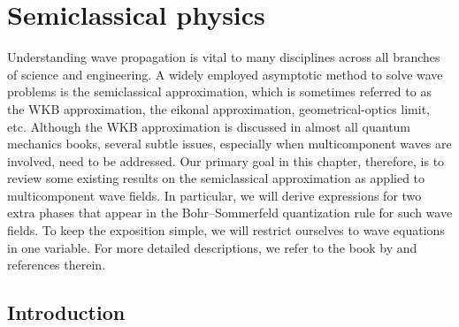 
\chapter{Semiclassical physics}
\label{chap04}


Understanding wave propagation is vital to many disciplines across all branches of science and engineering.
A widely employed asymptotic method to solve wave problems is the semiclassical approximation, which is sometimes referred to as the WKB approximation, the eikonal approximation, geometrical-optics limit, etc.
Although the WKB approximation is discussed in almost all quantum mechanics books, several subtle issues, especially when multicomponent waves are involved, need to be addressed.
Our primary goal in this chapter, therefore, is to review some existing results on the semiclassical approximation as applied to multicomponent wave fields.
In particular, we will derive expressions for two extra phases that appear in the Bohr--Sommerfeld quantization rule for such wave fields.
To keep the exposition simple, we will restrict ourselves to wave equations in one variable.
For more detailed descriptions, we refer to the book by \citet{tracy2014} and references therein.

\section{Introduction}
\label{sec:varintro}

